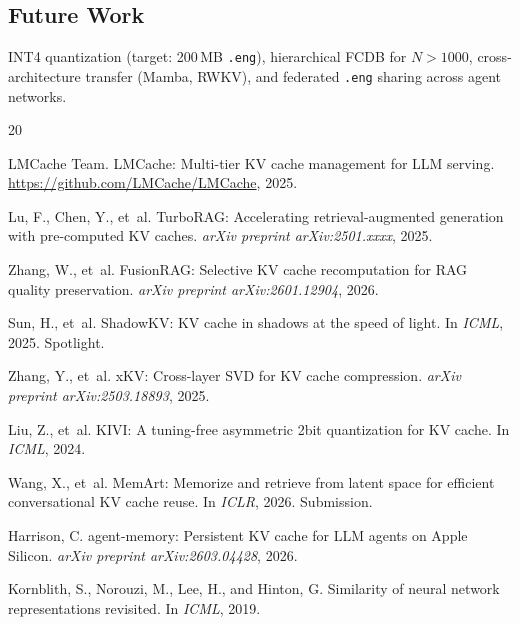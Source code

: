\documentclass[11pt,twocolumn]{article}
\newcommand{\fcdb}{\textsc{FCDB}}
\begin{document}
\subsection*{Future Work}

INT4 quantization (target: 200\,MB \texttt{.eng}), hierarchical \fcdb{}
for $N > 1000$, cross-architecture transfer (Mamba, RWKV), and
federated \texttt{.eng} sharing across agent networks.



\begin{thebibliography}{20}

{LMCache Team}.
\newblock LMCache: Multi-tier KV cache management for LLM serving.
\newblock \url{https://github.com/LMCache/LMCache}, 2025.

Lu, F., Chen, Y., et~al.
\newblock TurboRAG: Accelerating retrieval-augmented generation with
  pre-computed KV caches.
\newblock \emph{arXiv preprint arXiv:2501.xxxx}, 2025.

Zhang, W., et~al.
\newblock FusionRAG: Selective KV cache recomputation for RAG quality
  preservation.
\newblock \emph{arXiv preprint arXiv:2601.12904}, 2026.

Sun, H., et~al.
\newblock ShadowKV: KV cache in shadows at the speed of light.
\newblock In \emph{ICML}, 2025. Spotlight.

Zhang, Y., et~al.
\newblock xKV: Cross-layer SVD for KV cache compression.
\newblock \emph{arXiv preprint arXiv:2503.18893}, 2025.

Liu, Z., et~al.
\newblock KIVI: A tuning-free asymmetric 2bit quantization for KV cache.
\newblock In \emph{ICML}, 2024.

Wang, X., et~al.
\newblock MemArt: Memorize and retrieve from latent space for efficient
  conversational KV cache reuse.
\newblock In \emph{ICLR}, 2026. Submission.

Harrison, C.
\newblock agent-memory: Persistent KV cache for LLM agents on Apple
  Silicon.
\newblock \emph{arXiv preprint arXiv:2603.04428}, 2026.

Kornblith, S., Norouzi, M., Lee, H., and Hinton, G.
\newblock Similarity of neural network representations revisited.
\newblock In \emph{ICML}, 2019.


\end{thebibliography}
\end{document}

